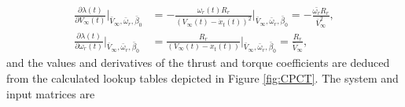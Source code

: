 \begin{align*}
    \frac{ \partial \lambda(t)}{\partial V_{\infty}(t)}\bigg|_{\bar{V}_{\infty},\bar{\omega}_r,\bar{\beta}_0} &= - \frac{\omega_r(t) R_r}{(V_{\infty}(t)-\dot{x}_t(t))^2}\bigg|_{\bar{V}_{\infty},\bar{\omega}_r,\bar{\beta}_0} = - \frac{\bar{\omega_r}R_r}{\bar{V}_{\infty}^2},\\
    \frac{ \partial \lambda(t)}{\partial \omega_{r}(t)}\bigg|_{\bar{V}_{\infty},\bar{\omega}_r,\bar{\beta}_0} &=  \frac{ R_r}{(V_{\infty}(t)-\dot{x}_t(t))}\bigg|_{\bar{V}_{\infty},\bar{\omega}_r,\bar{\beta}_0} = \frac{R_r}{\bar{V}_{\infty}},
\end{align*}
and the values and derivatives of the thrust and torque coefficients are deduced from the calculated lookup tables depicted in Figure \ref{fig:CPCT}.
The system and input matrices are

